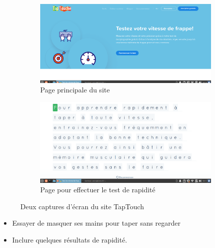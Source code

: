 \documentclass[12pt]{article}
\begin{document}
\begin{figure}[h]
  \centering
  \begin{subfigure}{0.45\textwidth}
    \centering
    \includegraphics[width=\textwidth]{Images-TD-Env-Efficiency/Image-TD-2/image_site_tap_touche.png}
    \caption{Page principale du site}
  \end{subfigure}
  \vspace{0.9cm} %
  \begin{subfigure}{0.45\textwidth}
    \centering
    \includegraphics[width=\textwidth]{Images-TD-Env-Efficiency/Image-TD-2/image_site_tap_touche2.png}
    \caption{Page pour effectuer le test de rapidité}
  \end{subfigure}
  \caption{Deux captures d'écran du site TapTouch}
\end{figure}

\vspace{0.3cm}

\begin{itemize}
  \item Essayer de masquer ses mains pour taper sans regarder
\end{itemize}

\vspace{0.3cm}

\begin{itemize}
  \item Inclure quelques résultats de rapidité.
\end{itemize}
\end{document}
